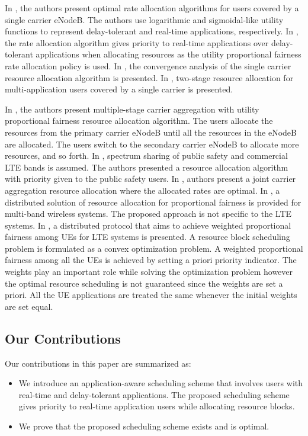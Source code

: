 \documentclass[conference]{IEEEtran}
\begin{document}
In \cite{Ahmed_Utility1, Ahmed_Utility2, Ahmed_Utility3}, the authors present optimal rate allocation algorithms for users covered by a single carrier eNodeB. The authors use logarithmic and sigmoidal-like utility functions to represent delay-tolerant and real-time applications, respectively. In \cite{Ahmed_Utility1}, the rate allocation algorithm gives priority to real-time applications over delay-tolerant applications when allocating resources as the utility proportional fairness  rate allocation policy is used. In \cite{Ahmed_Utility2}, the convergence analysis of the single carrier resource allocation algorithm is presented. In \cite{Ahmed_Utility3}, two-stage resource allocation for multi-application users covered by a single carrier is presented.

In \cite{Haya_Utility1}, the authors present multiple-stage carrier aggregation with utility proportional fairness resource allocation algorithm. The users allocate the resources from the primary carrier eNodeB until all the resources in the eNodeB are allocated. The users switch to the secondary carrier eNodeB to allocate more resources, and so forth. In \cite{Haya_Utility2}, spectrum sharing of public safety and commercial LTE bands is assumed. The authors presented a resource allocation algorithm with priority given to the public safety users. In \cite{Ahmed_Utility4}, authors present a joint carrier aggregation resource allocation where the allocated rates are optimal. In \cite{MultiBand}, a distributed solution of resource allocation for proportional fairness is provided for multi-band wireless systems. The proposed approach is not specific to the LTE systems. In \cite{SelfOrganizedLTE}, a distributed protocol that aims to achieve weighted proportional fairness among UEs for LTE systems is presented. A resource block scheduling problem is formulated as a convex optimization problem. A weighted proportional fairness among all the UEs is achieved by setting a priori priority indicator. The weights play an important role while solving the optimization problem however the optimal resource scheduling is not guaranteed since the weights are set a priori. All the UE applications are treated the same whenever the initial weights are set equal.   

\subsection{Our Contributions}\label{sec:contributions}
Our contributions in this paper are summarized as:
\begin{itemize}
\item We introduce an application-aware scheduling scheme that involves users with real-time and delay-tolerant applications. The proposed scheduling scheme gives priority to real-time application users while allocating resource blocks. 
\item We prove that the proposed scheduling scheme exists and is optimal.
\end{itemize}
\end{document}
